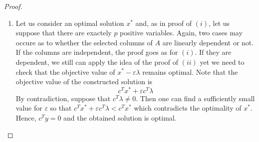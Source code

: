 \begin{proof}
\begin{enumerate}[label=(\roman*)]
        \item Let us consider an optimal solution $x^*$ and, as in proof of $(i)$, let us suppose that there are exactely $p$ positive variables. Again, two cases may occure as to whether the selected columns of $A$ are linearly dependent or not. If the columns are independent, the proof goes as for $(i)$. If they are dependent, we still can apply the idea of the proof of $(ii)$ yet we need to check that the objective value of $x^* - \varepsilon \lambda$ remains optimal. Note that the objective value of the constructed solution is \[ c^Tx^* + \varepsilon c^T\lambda \] By contradiction, suppose that $c^T\lambda\ne 0$. Then one can find a sufficiently small value for $\varepsilon$ so that $c^Tx^* + \varepsilon c^T\lambda < c^Tx^*$ which contradicts the optimality of $x^*$. Hence, $c^Ty = 0$ and the obtained solution is optimal. 
    \end{enumerate}
\end{proof}

